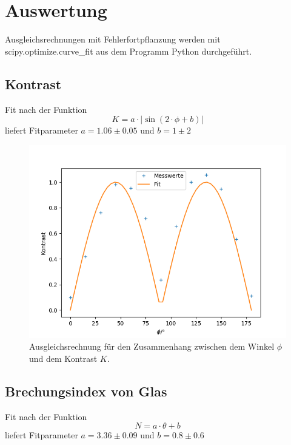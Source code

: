 \section{Auswertung}

Ausgleichsrechnungen mit Fehlerfortpflanzung werden mit scipy.optimize.curve\_fit aus dem Programm
Python durchgeführt.

\subsection{Kontrast}

Fit nach der Funktion
\[
K = a \cdot | \sin (2 \cdot \phi + b) |
\]
liefert Fitparameter $a = 1.06 \pm 0.05$ und $b = 1 \pm 2$

\begin{figure}[h]
\centering
\includegraphics[width=\linewidth]{img/kontrast.png}
\caption{Ausgleichsrechnung für den Zusammenhang zwischen dem Winkel $\phi$ und dem Kontrast $K$.}
\label{kontrast}
\end{figure}

\subsection{Brechungsindex von Glas}

Fit nach der Funktion
\[
N = a \cdot \theta + b
\]
liefert Fitparameter $a = 3.36 \pm 0.09$ und $b = 0.8 \pm 0.6$

